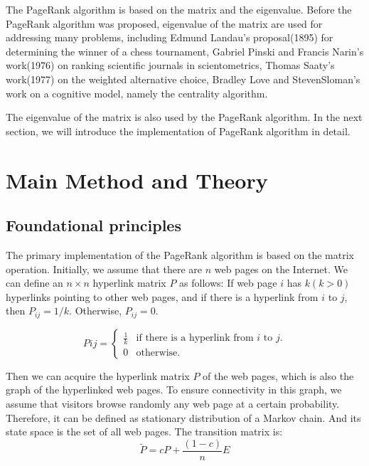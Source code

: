 \documentclass[lettersize,journal,12pt,conference]{IEEEtran}
\begin{document}
The PageRank algorithm is based on the matrix and the eigenvalue. Before the PageRank algorithm was proposed, eigenvalue of the matrix are used for addressing many problems, including Edmund Landau's proposal(1895) for determining the winner of a chess tournament, Gabriel Pinski and Francis Narin's work(1976) on ranking scientific journals in scientometrics, Thomas Saaty's work(1977) on the weighted alternative choice, Bradley Love and StevenSloman's work on a cognitive model, namely the centrality algorithm.

The eigenvalue of the matrix is also used by the PageRank algorithm. In the next section, we will introduce the implementation of PageRank algorithm in detail.

\section{Main Method and Theory}

\subsection{Foundational principles}

The primary implementation of the PageRank algorithm is based on the matrix operation.
Initially, we assume that there are $n$ web pages on the Internet. We can define an $n \times n$ hyperlink matrix $P$ as follows: If web page $i$ has $k (k > 0)$ hyperlinks pointing to other web pages, and if there is a hyperlink from $i$ to $j$, then $P_{ij} = 1/k$. Otherwise, $P_{ij} = 0$.

\begin{equation}
	\label{eq:1}
	Pij = 
	\begin{cases}
		\frac{1}{k} & \text{if there is a hyperlink from $i$ to $j$.} \\
		0 & \text{otherwise.}
	\end{cases}
\end{equation}

Then we can acquire the hyperlink matrix $P$ of the web pages, which is also the graph of the hyperlinked web pages.
To ensure connectivity in this graph, we assume that visitors browse randomly any web page at a certain probability. Therefore, it can be defined as stationary distribution of a Markov chain. And its state space is the set of all web pages. The transition matrix is:
\begin{equation}
	\label{eq:2}
	\widetilde{P} = cP + \frac{(1 - c)}{n}E
\end{equation}
\end{document}
